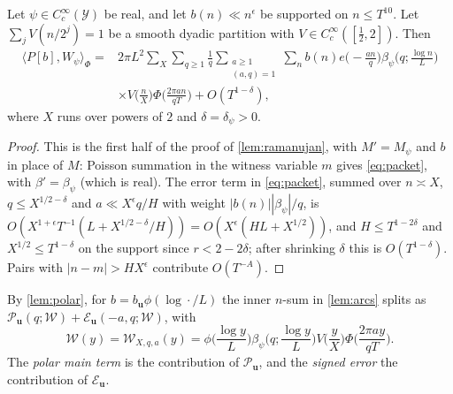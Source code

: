 \documentclass[11pt,colorlinks]{charlie}
\newcommand{\ip}[2]{\langle #1,#2\rangle}
\begin{document}
\begin{lemma}[Arcs]\label{lem:arcs}
Let $\psi\in C_c^\infty(\mathcal Y)$ be real, and let $b(n)\ll n^\epsilon$ be supported on $n\le T^{10}$. Let $\sum_jV(n/2^j)=1$ be a smooth dyadic partition with $V\in C_c^\infty([\frac12,2])$. Then
\[
 \begin{split}
 \ip{P[b]}{W_\psi}_\Phi={}&2\pi L^2\sum_{X}\sum_{q\ge1}\frac1q\sum_{\substack{a\ge1\\(a,q)=1}}\sum_nb(n)e\Big(-\frac{an}q\Big)\beta_\psi\Big(q;\frac{\log n}L\Big)\\
 &\times V\Big(\frac nX\Big)\Phi\Big(\frac{2\pi an}{qT}\Big)+O(T^{1-\delta}),
 \end{split}
\]
where $X$ runs over powers of $2$ and $\delta=\delta_\psi>0$.
\end{lemma}
\begin{proof}
This is the first half of the proof of \cref{lem:ramanujan}, with $M'=M_\psi$ and $b$ in place of $M$: Poisson summation in the witness variable $m$ gives \eqref{eq:packet}, with $\beta'=\beta_\psi$ (which is real). The error term in \eqref{eq:packet}, summed over $n\asymp X$, $q\le X^{1/2-\delta}$ and $a\ll X^\epsilon q/H$ with weight $|b(n)||\beta_\psi|/q$, is $O(X^{1+\epsilon}T^{-1}(L+X^{1/2-\delta}/H))=O(X^{\epsilon}(HL+X^{1/2}))$, and $H\le T^{1-2\delta}$ and $X^{1/2}\le T^{1-\delta}$ on the support since $r<2-2\delta$; after shrinking $\delta$ this is $O(T^{1-\delta})$. Pairs with $|n-m|>HX^\epsilon$ contribute $O(T^{-A})$.
\end{proof}

By \cref{lem:polar}, for $b=b_{\boldsymbol u}\phi(\log\cdot/L)$ the inner $n$-sum in \cref{lem:arcs} splits as $\mathcal P_{\boldsymbol u}(q;\mathcal W)+\mathcal E_{\boldsymbol u}(-a,q;\mathcal W)$, with
\begin{equation}\label{eq:arcweight}
 \mathcal W(y)=\mathcal W_{X,q,a}(y)=\phi\Big(\frac{\log y}L\Big)\beta_\psi\Big(q;\frac{\log y}L\Big)V\Big(\frac yX\Big)\Phi\Big(\frac{2\pi ay}{qT}\Big).
\end{equation}
The \emph{polar main term} is the contribution of $\mathcal P_{\boldsymbol u}$, and the \emph{signed error} the contribution of $\mathcal E_{\boldsymbol u}$.
\end{document}

